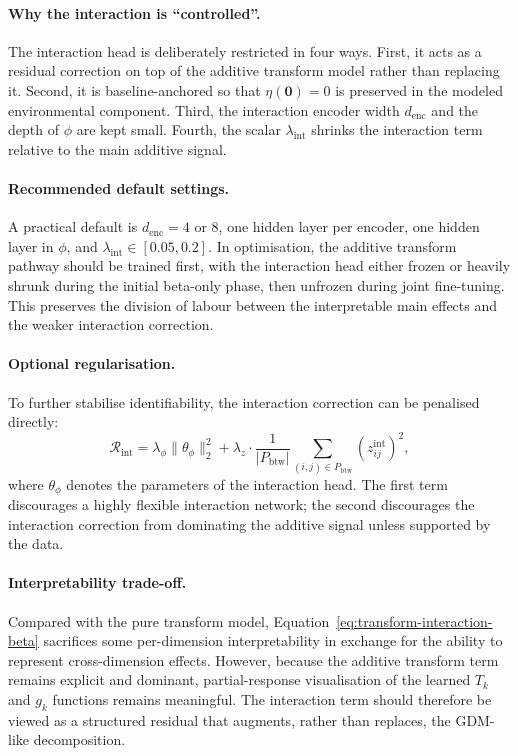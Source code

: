 \documentclass{article}
\begin{document}
\paragraph{Why the interaction is ``controlled''.}
The interaction head is deliberately restricted in four ways.
First, it acts as a residual correction on top of the additive transform model rather than replacing it.
Second, it is baseline-anchored so that $\eta(\mathbf{0}) = 0$ is preserved in the modeled environmental component.
Third, the interaction encoder width $d_{\text{enc}}$ and the depth of $\phi$ are kept small.
Fourth, the scalar $\lambda_{\text{int}}$ shrinks the interaction term relative to the main additive signal.

\paragraph{Recommended default settings.}
A practical default is $d_{\text{enc}} = 4$ or $8$, one hidden layer per encoder, one hidden layer in $\phi$, and $\lambda_{\text{int}} \in [0.05, 0.2]$. In optimisation, the additive transform pathway should be trained first, with the interaction head either frozen or heavily shrunk during the initial beta-only phase, then unfrozen during joint fine-tuning. This preserves the division of labour between the interpretable main effects and the weaker interaction correction.

\paragraph{Optional regularisation.}
To further stabilise identifiability, the interaction correction can be penalised directly:
\begin{equation}
    \mathcal{R}_{\text{int}}
    =
    \lambda_{\phi} \|\theta_{\phi}\|_2^2
    +
    \lambda_{z}
    \cdot
    \frac{1}{|P_{\text{btw}}|}
    \sum_{(i,j)\in P_{\text{btw}}}
    \left(z_{ij}^{\text{int}}\right)^2,
\end{equation}
where $\theta_{\phi}$ denotes the parameters of the interaction head. The first term discourages a highly flexible interaction network; the second discourages the interaction correction from dominating the additive signal unless supported by the data.

\paragraph{Interpretability trade-off.}
Compared with the pure transform model, Equation~\ref{eq:transform-interaction-beta} sacrifices some per-dimension interpretability in exchange for the ability to represent cross-dimension effects. However, because the additive transform term remains explicit and dominant, partial-response visualisation of the learned $T_k$ and $g_k$ functions remains meaningful. The interaction term should therefore be viewed as a structured residual that augments, rather than replaces, the GDM-like decomposition.
\end{document}
